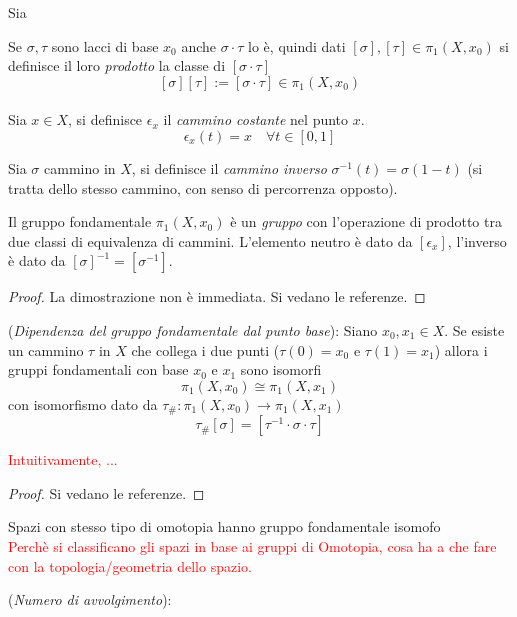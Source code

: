 \begin{definition}
   Sia
\end{definition}

Se $\sigma,\tau$ sono lacci di base $x_0$ anche $\sigma \cdot \tau$ lo è, quindi
dati $[\sigma],[\tau] \in \pi_1(X,x_0)$ si definisce il loro \emph{prodotto}
la classe di $[\sigma \cdot \tau]$
$$ [\sigma][\tau] := [\sigma\cdot\tau] \in \pi_1(X,x_0) $$\\

Sia $x \in X$, si definisce $\epsilon_x$ il \emph{cammino costante} nel punto $x$.
$$\epsilon_x(t) = x \quad \forall t \in[0,1]$$

Sia $\sigma$ cammino in $X$, si definisce il \emph{cammino inverso}
$\sigma^{-1}(t) = \sigma(1-t)$ (si tratta dello stesso cammino, con senso
di percorrenza opposto).

\begin{proposition}
   Il gruppo fondamentale $\pi_1(X,x_0)$ è un \emph{gruppo} con l'operazione di
   prodotto tra due classi di equivalenza di cammini.
   L'elemento neutro è dato da $[\epsilon_x]$,
   l'inverso è dato da $[\sigma]^{-1} = [\sigma^{-1}]$.
\end{proposition}
\begin{proof}
   La dimostrazione non è immediata. Si vedano le referenze.
\end{proof}

\begin{proposition}(\emph{Dipendenza del gruppo fondamentale dal punto base}):
   Siano $x_0, x_1 \in X$. Se esiste un cammino $\tau$ in $X$ che collega i due
   punti ($\tau(0)=x_0$ e $\tau(1)=x_1$) allora i gruppi fondamentali con base
   $x_0$ e $x_1$ sono isomorfi
      $$ \pi_1(X,x_0) \cong \pi_1(X,x_1) $$
   con isomorfismo dato da $\tau_\# : \pi_1(X,x_0) \to \pi_1(X,x_1)$
      $$  \tau_\# [\sigma] = [\tau^{-1} \cdot \sigma \cdot \tau] $$
\end{proposition}
\textcolor{red}{Intuitivamente, ...}
\begin{proof} Si vedano le referenze. \end{proof}


Spazi con stesso tipo di omotopia hanno gruppo fondamentale isomofo\\
\textcolor{red}{Perchè si classificano gli spazi in base ai gruppi di Omotopia,
cosa ha a che fare con la topologia/geometria dello spazio.}\\
\begin{definition}(\emph{Numero di avvolgimento}):

\end{definition}
